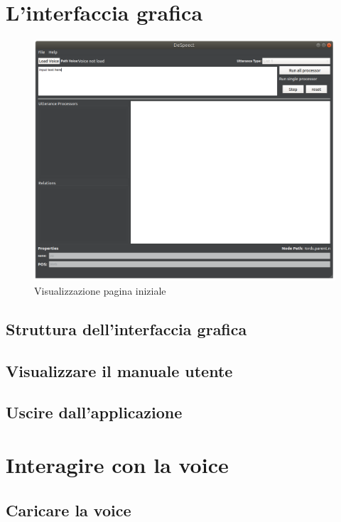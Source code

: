 \documentclass[openany,12pt,a4paper]{report}
\begin{document}
	\section{L'interfaccia grafica}
	\begin{figure}[H]
		
		\centering
		
		\includegraphics[width=\textwidth]{./img/avvio.png}
		
		\caption{Visualizzazione pagina iniziale}
		
	\end{figure}
	
	\subsection{Struttura dell'interfaccia grafica}
	
	\subsection{Visualizzare il manuale utente}
	
	\subsection{Uscire dall'applicazione}
	
	\section{Interagire con la voice}
	
	\subsection{Caricare la voice}
	
\end{document}
